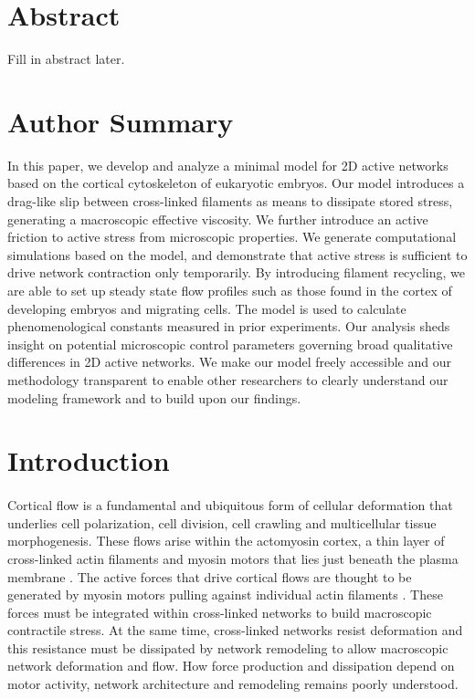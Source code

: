 \documentclass[10pt,letterpaper]{article}
\begin{document}
\section*{Abstract}
Fill in abstract later.


\section*{Author Summary}
In this paper, we develop and analyze a minimal model for 2D active networks based on the cortical cytoskeleton of eukaryotic embryos.  Our model introduces a drag-like slip between cross-linked filaments as means to dissipate stored stress, generating a macroscopic effective viscosity.  We further introduce an active friction to active stress from microscopic properties.  We generate computational simulations based on the model, and demonstrate that active stress is sufficient to drive network contraction only temporarily.  By introducing filament recycling, we are able to set up steady state flow profiles such as those found in the cortex of developing embryos and migrating cells.  The model is used to calculate phenomenological constants measured in prior experiments.  Our analysis sheds insight on potential microscopic control parameters governing broad qualitative differences in 2D active networks.  We make our model freely accessible and our methodology transparent to enable other researchers to clearly understand our modeling framework and to build upon our findings.

\linenumbers

\section*{Introduction}

\paragraph{}  Cortical flow is a fundamental and ubiquitous form of cellular deformation that underlies cell polarization, cell division, cell crawling and multicellular tissue morphogenesis\cite{cellmech_flows3,cellmech_flows2}.  These flows arise within the actomyosin cortex, a thin layer of cross-linked actin filaments and myosin motors that lies just beneath the plasma membrane \cite{Salbreux2012536}. The active forces that drive cortical flows are thought to be generated by myosin motors pulling against individual actin filaments \cite{Munro2004413}. These forces must be integrated within cross-linked networks to build macroscopic contractile stress.  At the same time, cross-linked networks resist deformation and this resistance must be dissipated by network remodeling to allow macroscopic network deformation and flow.  How force production and dissipation depend on motor activity, network architecture and remodeling remains poorly understood.
\end{document}
